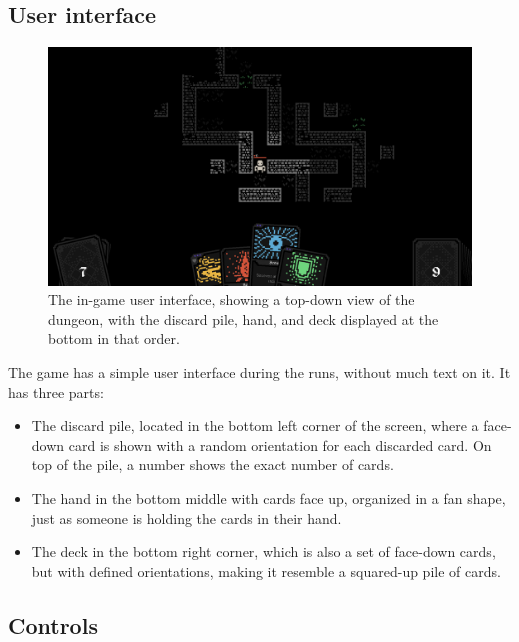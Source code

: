 \subsection{User interface}

\begin{figure}[h]
    \centering
    \includegraphics[width=\textwidth]{images/user_interface.png} 
    \caption{The in-game user interface, showing a top-down view of the dungeon, with the discard pile, hand, and deck displayed at the bottom in that order.}
    \label{figure:userInterface}
\end{figure}

The game has a simple user interface during the runs, without much text on it. It has three parts: 

\begin{itemize}
    \item The discard pile, located in the bottom left corner of the screen, where a face-down card is shown with a random orientation for each discarded card. On top of the pile, a number shows the exact number of cards.
    \item The hand in the bottom middle with cards face up, organized in a fan shape, just as someone is holding the cards in their hand. 
    \item The deck in the bottom right corner, which is also a set of face-down cards, but with defined orientations, making it resemble a squared-up pile of cards.
\end{itemize}



\subsection{Controls}

